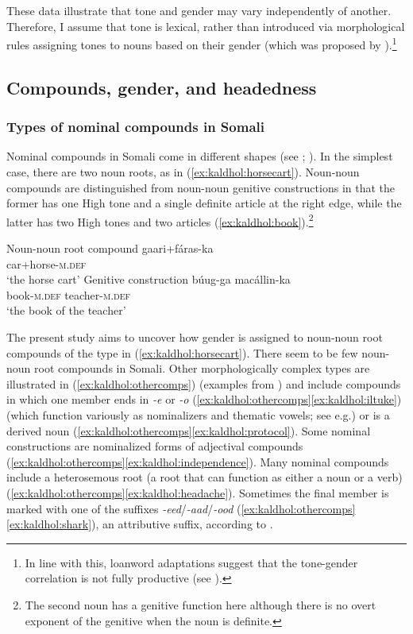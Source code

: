 \documentclass[output=paper]{langscibook}
\begin{document}
\noindent These data illustrate that tone and gender may vary independently of another. Therefore, I assume that tone is lexical, rather than introduced via morphological rules assigning tones to nouns based on their gender (which was proposed by \citealt{Hyman1981}).\footnote{In line with this, loanword adaptations suggest that the tone-gender correlation is not fully productive (see \citealt{Kaldhol2017,Kaldhol2020a}).}

\subsection{Compounds, gender, and headedness}\label{sec:kaldhol:headedness}
\subsubsection{Types of nominal compounds in Somali}\label{sec:kaldhol:types}
Nominal compounds in Somali come in different shapes (see \citealt{Banti2016a,Puglielli1989}; \citealt[154--160]{Saeed1999a}). In the simplest case, there are two noun roots, as in (\ref{ex:kaldhol:horsecart}). Noun-noun compounds are distinguished from noun-noun genitive constructions in that the former has one High tone and a single definite article at the right edge, while the latter has two High tones and two articles (\ref{ex:kaldhol:book}).\footnote{The second noun has a genitive function here although there is no overt exponent of the genitive when the noun is definite.}

\begin{multicols}{2}
\ea\label{ex:kaldhol:horsecart}
		Noun-noun root compound
		\gll gaari+fáras-ka\\
		car+horse-\textsc{m.def}\\
		\glt `the horse cart'
\ex\label{ex:kaldhol:book}
	Genitive construction
	\gll búug-ga macállin-ka\\
	book-\textsc{m.def} teacher-\textsc{m.def}\\
	\glt `the book of the teacher'
\z
\end{multicols}
The present study aims to uncover how gender is assigned to noun-noun root compounds of the type in (\ref{ex:kaldhol:horsecart}). There seem to be few noun-noun root compounds in Somali. Other morphologically complex types are illustrated in (\ref{ex:kaldhol:othercomps}) (examples from \citealt{Zorc1993}) and include compounds in which one member ends in \textit{-e} or \textit{-o} (\ref{ex:kaldhol:othercomps}\ref{ex:kaldhol:iltuke}) (which function variously as nominalizers and thematic vowels; see e.g.\@ \citealt[295]{LeGac2016}) or is a derived noun (\ref{ex:kaldhol:othercomps}\ref{ex:kaldhol:protocol}). Some nominal constructions are nominalized forms of adjectival compounds (\ref{ex:kaldhol:othercomps}\ref{ex:kaldhol:independence}). Many nominal compounds include a heterosemous root (a root that can function as either a noun or a verb) (\ref{ex:kaldhol:othercomps}\ref{ex:kaldhol:headache}). Sometimes the final member is marked with one of the suffixes \textit{-eed}/\textit{-aad}/\mbox{\textit{-ood}} (\ref{ex:kaldhol:othercomps}\ref{ex:kaldhol:shark}), an attributive suffix, according to \textcite{Banti1986, Banti1988a}.
\end{document}
